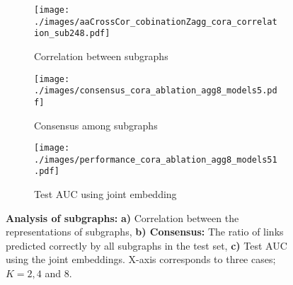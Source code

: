 \documentclass{article}
\begin{document}
\begin{figure}[t]
\vskip 0.2in
\begin{center}
     \begin{subfigure}[c]{0.32\columnwidth}
        \texttt{[image: ./images/aaCrossCor\_cobinationZagg\_cora\_correlation\_sub248.pdf]}
         \caption{Correlation between subgraphs}
     \end{subfigure}
     \begin{subfigure}[c]{0.32\columnwidth}
        \texttt{[image: ./images/consensus\_cora\_ablation\_agg8\_models5.pdf]}
         \caption{Consensus among subgraphs}
     \end{subfigure}
     \begin{subfigure}[c]{0.32\columnwidth}
        \texttt{[image: ./images/performance\_cora\_ablation\_agg8\_models51.pdf]}
         \caption{Test AUC using joint embedding}
     \end{subfigure}
\caption{\textbf{Analysis of subgraphs:} \textbf{a)} Correlation between the representations of subgraphs,  \textbf{b) Consensus:} The ratio of links predicted correctly by all subgraphs in the test set,  \textbf{c)} Test AUC using the joint embeddings. X-axis corresponds to three cases; $K=2, 4$ and $8$.}\label{fig:analysis_subgraphs}
\end{center}
\vskip -0.2in
\end{figure}
\end{document}
